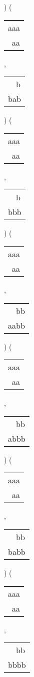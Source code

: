 ) 
 ( 
\begin{tabular}{|l|} \hline
aaa \\
\ aa \\
\hline
\end{tabular} 
 , 
\begin{tabular}{|l|} \hline
\ \ b \\
bab \\
\hline
\end{tabular} 
) 
 ( 
\begin{tabular}{|l|} \hline
aaa \\
\ aa \\
\hline
\end{tabular} 
 , 
\begin{tabular}{|l|} \hline
\ \ b \\
bbb \\
\hline
\end{tabular} 
) 
 ( 
\begin{tabular}{|l|} \hline
aaa \\
\ aa \\
\hline
\end{tabular} 
 , 
\begin{tabular}{|l|} \hline
\ \ bb \\
aabb \\
\hline
\end{tabular} 
) 
 ( 
\begin{tabular}{|l|} \hline
aaa \\
\ aa \\
\hline
\end{tabular} 
 , 
\begin{tabular}{|l|} \hline
\ \ bb \\
abbb \\
\hline
\end{tabular} 
) 
 ( 
\begin{tabular}{|l|} \hline
aaa \\
\ aa \\
\hline
\end{tabular} 
 , 
\begin{tabular}{|l|} \hline
\ \ bb \\
babb \\
\hline
\end{tabular} 
) 
 ( 
\begin{tabular}{|l|} \hline
aaa \\
\ aa \\
\hline
\end{tabular} 
 , 
\begin{tabular}{|l|} \hline
\ \ bb \\
bbbb \\
\hline
\end{tabular} 
